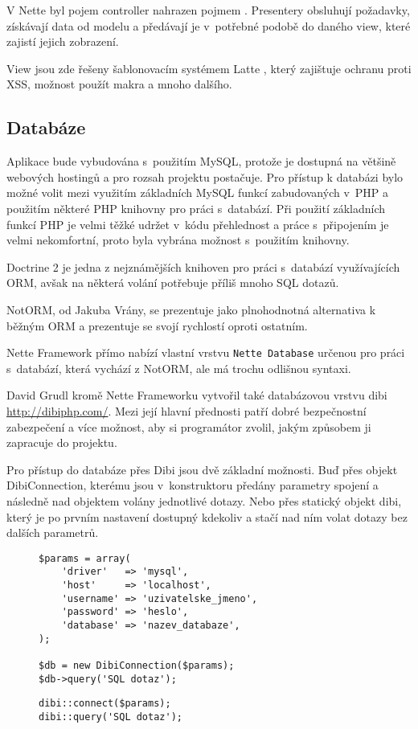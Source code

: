 \documentclass[thesis=B,czech]{FITthesis}[2012/04/27]
\begin{document}
V Nette byl pojem controller nahrazen pojmem . Presentery obsluhují požadavky, získávají data od modelu a předávají je v~potřebné podobě do daného view, které zajistí jejich zobrazení.

View jsou zde řešeny šablonovacím systémem Latte \cite{latte}, který zajištuje ochranu proti XSS\cite{xss}, možnost použít makra a mnoho dalšího.

\subsection{Databáze}
Aplikace bude vybudována s~použitím MySQL, protože je dostupná na většině webových hostingů a pro rozsah projektu postačuje. Pro přístup k databázi bylo možné volit mezi využitím základních MySQL funkcí zabudovaných v~PHP a použitím některé PHP knihovny pro práci s~databází. Při použití základních funkcí PHP je velmi těžké udržet v~kódu přehlednost a práce s~připojením je velmi nekomfortní, proto byla vybrána možnost s~použitím knihovny.

Doctrine 2 je jedna z nejznámějších knihoven pro práci s~databází využívajících ORM, avšak na některá volání potřebuje příliš mnoho SQL dotazů.

NotORM, od Jakuba Vrány, se prezentuje jako plnohodnotná alternativa k běžným ORM a prezentuje se svojí rychlostí oproti ostatním\cite{notorm}.

Nette Framework přímo nabízí vlastní vrstvu \texttt{Nette Database}\cite{netteDb} určenou pro práci s~databází, která vychází z NotORM, ale má trochu odlišnou syntaxi.

David Grudl kromě Nette Frameworku vytvořil také databázovou vrstvu dibi \url{http://dibiphp.com/}. Mezi její hlavní přednosti patří dobré bezpečnostní zabezpečení a více možnost, aby si programátor zvolil, jakým způsobem ji zapracuje do projektu.

Pro přístup do databáze přes Dibi jsou dvě základní možnosti. Buď přes objekt DibiConnection, kterému jsou v~konstruktoru předány parametry spojení a následně nad objektem volány jednotlivé dotazy. Nebo přes statický objekt dibi, který je po prvním nastavení dostupný kdekoliv a stačí nad ním volat dotazy bez dalších parametrů.

\begin{figure}[h]
\begin{lstlisting}[caption=použití Dibi s~přístupem přes objekt, numbers=none]
$params = array(
    'driver'   => 'mysql',
    'host'     => 'localhost',
    'username' => 'uzivatelske_jmeno',
    'password' => 'heslo',
    'database' => 'nazev_databaze',
);

$db = new DibiConnection($params);
$db->query('SQL dotaz');
\end{lstlisting}

\begin{lstlisting}[caption=použití Dibi se statickým přístupem, numbers=none]
dibi::connect($params);
dibi::query('SQL dotaz');
\end{lstlisting}
\end{figure}
\end{document}
